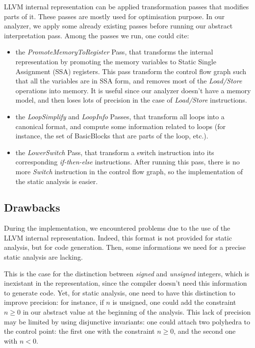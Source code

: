 \documentclass[a4paper,english,titlepage,11pt]{report}
\begin{document}
LLVM internal representation can be applied transformation passes that modifies
parts of it. These passes are mostly used for optimisation purpose. In our
analyzer, we apply some already existing passes before running our 
abstract interpretation pass. Among the passes we run, one could cite:
\begin{itemize}
\item the \emph{PromoteMemoryToRegister} Pass, that transforms the internal
representation by promoting the memory variables to Static Single Assignment
(SSA) registers. This pass transform the control flow graph such that all the
variables are in SSA form, and removes most of the \emph{Load/Store} operations
into memory. It is useful since our analyzer doesn't have a memory model, and
then loses lots of precision in the case of \emph{Load/Store} instructions.
\item the \emph{LoopSimplify} and \emph{LoopInfo} Passes, that transform all loops into a canonical
format, and compute some information related to loops (for instance, the set of
BasicBlocks that are parts of the loop, etc.).
\item the \emph{LowerSwitch} Pass, that transform a switch instruction into its
corresponding \emph{if-then-else} instructions. After running this pass, there
is no more \emph{Switch} instruction in the control flow graph, so the
implementation of the static analysis is easier.
\end{itemize}


\subsection{Drawbacks}

During the implementation, we encountered problems due to the use of the LLVM
internal representation. Indeed, this format is not provided for static
analysis, but for code generation. Then, some informations we need for a precise
static analysis are lacking.

This is the case for the distinction between \emph{signed} and \emph{unsigned}
integers, which is inexistant in the representation, since the compiler doesn't
need this information to generate code. Yet, for static analysis, one need to
have this distinction to improve precision:
for instance, if $n$ is unsigned, one could add the constraint $n \geq 0$ in our
	abstract value at the beginning of the analysis.
	This lack of precision may be limited by using disjunctive invariants: one
	could attach two polyhedra to the control point: the first one with the
	constraint $n \geq 0$, and the second one with $n < 0$.
\end{document}
